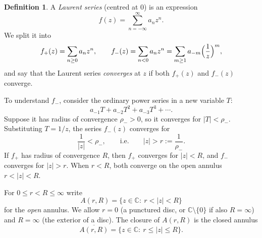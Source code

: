 \documentclass[11pt]{article}
\theoremstyle{plain}
\theoremstyle{definition}
\newtheorem{definition}[theorem]{Definition}
\theoremstyle{boldremark}
\theoremstyle{remark}
\numberwithin{equation}{section}
\newcommand{\C}{\mathbb{C}}
\newenvironment{lecturefigure}
 {\par\addvspace{0.25em}\begingroup\setlength{\parskip}{0pt}\centering}
 {\par\endgroup\addvspace{0.25em}}
\begin{document}
\begin{definition}
A \emph{Laurent series} (centred at $0$) is an expression
\[
 f(z)=\sum_{n=-\infty}^{\infty}a_nz^n .
\]
We split it into
\[
 f_+(z)=\sum_{n\geq0}a_nz^n,\qquad f_-(z)=\sum_{n<0}a_nz^n
 =\sum_{m\geq1}a_{-m}\Bigl(\frac1z\Bigr)^m,
\]
and say that the Laurent series \emph{converges} at $z$ if both $f_+(z)$
and $f_-(z)$ converge.
\end{definition}

To understand $f_-$, consider the ordinary power series in a new
variable $T$:
\[
 a_{-1}T+a_{-2}T^2+a_{-3}T^3+\cdots .
\]
Suppose it has radius of convergence $\rho_->0$, so it converges for
$|T|<\rho_-$. Substituting $T=1/z$, the series $f_-(z)$ converges for
\[
 \frac{1}{|z|}<\rho_-,\qquad\text{i.e.}\qquad |z|>r:=\frac{1}{\rho_-}.
\]
If $f_+$ has radius of convergence $R$, then $f_+$ converges for
$|z|<R$, and $f_-$ converges for $|z|>r$. When $r<R$, both converge on
the open annulus $r<|z|<R$.

\begin{lecturefigure}
\end{lecturefigure}

For $0\leq r<R\leq\infty$ write
\[
 A(r,R)=\{z\in\C:\ r<|z|<R\}
\]
for the \emph{open} annulus. We allow $r=0$ (a punctured disc, or
$\C\setminus\{0\}$ if also $R=\infty$) and $R=\infty$ (the exterior of a
disc). The closure of $A(r,R)$ is the closed annulus
\[
\overline{A(r,R)}=\{z\in\C:\ r\leq|z|\leq R\}.
\]
\end{document}
